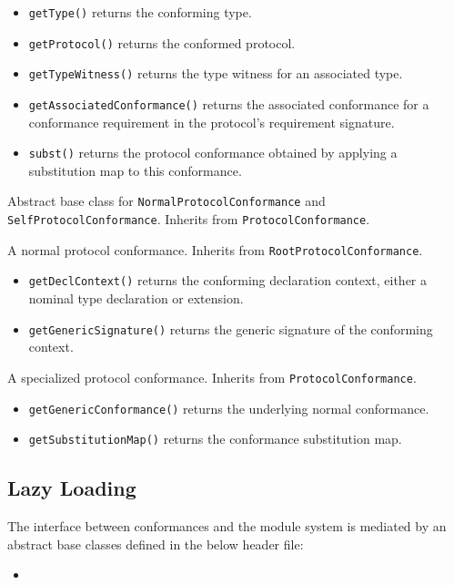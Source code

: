 \documentclass[../generics]{subfiles}
\begin{document}
\begin{itemize}
\item \texttt{getType()} returns the conforming type.
\item \texttt{getProtocol()} returns the conformed protocol.
\item \texttt{getTypeWitness()} returns the type witness for an associated type.
\item \texttt{getAssociatedConformance()} returns the associated conformance for a conformance requirement in the protocol's requirement signature.
\item \texttt{subst()} returns the protocol conformance obtained by applying a substitution map to this conformance.
\end{itemize}

Abstract base class for \texttt{NormalProtocolConformance} and \texttt{SelfProtocolConformance}. Inherits from \texttt{ProtocolConformance}.

A normal protocol conformance. Inherits from \texttt{RootProtocolConformance}.
\begin{itemize}
\item \texttt{getDeclContext()} returns the conforming declaration context, either a nominal type declaration or extension.
\item \texttt{getGenericSignature()} returns the generic signature of the conforming context.
\end{itemize}

A specialized protocol conformance. Inherits from \texttt{ProtocolConformance}.
\begin{itemize}
\item \texttt{getGenericConformance()} returns the underlying normal conformance.
\item \texttt{getSubstitutionMap()} returns the conformance substitution map.
\end{itemize}

\subsection*{Lazy Loading}

The interface between conformances and the module system is mediated by an abstract base classes defined in the below header file:
\begin{itemize}
\item {}
\end{itemize}
\end{document}
